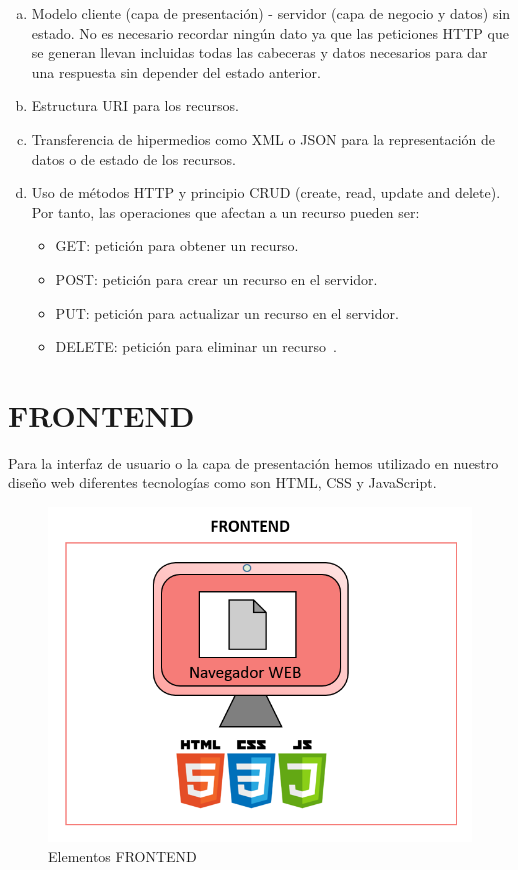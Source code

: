 \documentclass[a4paper, 12pt]{book}
\begin{document}
\begin{enumerate}[a)] %
\item Modelo cliente (capa de presentación) - servidor (capa de negocio y datos) sin estado. No es necesario recordar ningún dato ya que las peticiones HTTP que se generan llevan incluidas todas las cabeceras y datos necesarios para dar una respuesta sin depender del estado anterior.
\item Estructura URI para los recursos.
\item Transferencia de hipermedios como XML o JSON para la representación de datos o de estado de los recursos.
\item Uso de métodos HTTP y principio CRUD (create, read, update and delete). Por tanto, las operaciones que afectan a un recurso pueden ser:
\begin{itemize}
    \item GET: petición para obtener un recurso.
    \item POST: petición para crear un recurso en el servidor.
    \item PUT: petición para actualizar un recurso en el servidor.
    \item DELETE: petición para eliminar un recurso~\cite{rodriguez2008restful}.
\end{itemize}
\end{enumerate}
\section{FRONTEND}
Para la interfaz de usuario o la capa de presentación hemos utilizado en nuestro diseño web diferentes tecnologías como son HTML, CSS y JavaScript.
\begin{figure}[h]
        \centering
        \includegraphics[scale=0.4]{img/frontend.png}
        \caption{Elementos FRONTEND}
        \label{figura:frontend}
\end{figure}
\end{document}
